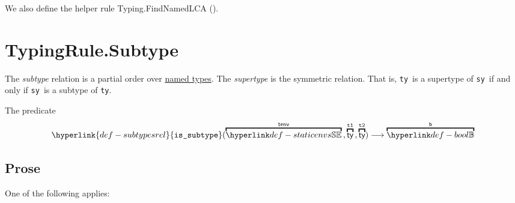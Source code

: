 \documentclass{book}
\newcommand\subtypesrel[0]{\hyperlink{def-subtypesrel}{\texttt{is\_subtype}}}
\newcommand\tty[0]{\texttt{ty}}
\newcommand\tsy[0]{\texttt{sy}}
\begin{document}
We also define the helper rule Typing.FindNamedLCA ().

\section{TypingRule.Subtype\label{sec:TypingRule.Subtype}}
The \emph{subtype} relation is a partial order over \underline{named types}.
The \emph{supertype} is the symmetric relation. That is, \tty\ is a supertype of \tsy\ if and only if \tsy\ is a subtype of \tty.

\hypertarget{def-subtypesrel}{}
The predicate
\[
  \subtypesrel(\overname{\staticenvs}{\tenv} \aslsep \overname{\ty}{\vtone} \aslsep \overname{\ty}{\vttwo})
  \aslto \overname{\Bool}{\vb}
\]

\subsection{Prose}
One of the following applies:
\end{document}
